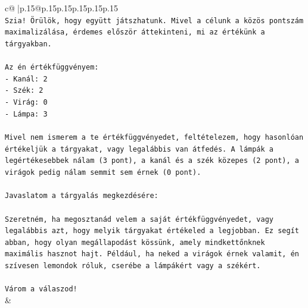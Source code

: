 \documentclass{article}
\begin{document}
{\begin{supertabular}{c@{$\;$}|p{.15\linewidth}@{}p{.15\linewidth}p{.15\linewidth}p{.15\linewidth}p{.15\linewidth}p{.15\linewidth}}
{{{\\ 
\texttt{Szia! Örülök, hogy együtt játszhatunk. Mivel a célunk a közös pontszám maximalizálása, érdemes először áttekinteni, mi az értékünk a tárgyakban.} \\
\\ 
\texttt{Az én értékfüggvényem:} \\
\texttt{{-} Kanál: 2} \\
\texttt{{-} Szék: 2} \\
\texttt{{-} Virág: 0} \\
\texttt{{-} Lámpa: 3} \\
\\ 
\texttt{Mivel nem ismerem a te értékfüggvényedet, feltételezem, hogy hasonlóan értékeljük a tárgyakat, vagy legalábbis van átfedés. A lámpák a legértékesebbek nálam (3 pont), a kanál és a szék közepes (2 pont), a virágok pedig nálam semmit sem érnek (0 pont).} \\
\\ 
\texttt{Javaslatom a tárgyalás megkezdésére:} \\
\\ 
\texttt{Szeretném, ha megosztanád velem a saját értékfüggvényedet, vagy legalábbis azt, hogy melyik tárgyakat értékeled a legjobban. Ez segít abban, hogy olyan megállapodást kössünk, amely mindkettőnknek maximális hasznot hajt. Például, ha neked a virágok érnek valamit, én szívesen lemondok róluk, cserébe a lámpákért vagy a székért.} \\
\\ 
\texttt{Várom a válaszod!} \\
            }
        }
    }
    & \\ \\


\end{supertabular}}
\end{document}
